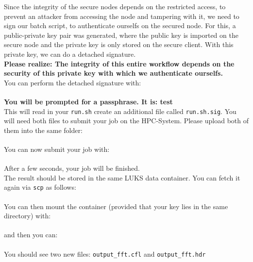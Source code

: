 \documentclass[paper=a4]{scrartcl}
\begin{document}
Since the integrity of the secure nodes depends on the restricted access, to prevent an attacker from accessing the node and tampering with it, we need to sign our batch script, to authenticate ourselfs on the secured node. 
For this, a public-private key pair was generated, where the public key is imported on the secure node and the private key is only stored on the secure client. With this private key, we can do a detached signature. 
\\
\textbf{Please realize: The integrity of this entire workflow depends on the security of this private key with which we authenticate ourselfs.}
\\
You can perform the detached signature with: \\
 \\
\textbf{You will be prompted for a passphrase. It is: test} \\
This will read in your \texttt{run.sh} create an additional file called \texttt{run.sh.sig}. 
You will need both files to submit your job on the HPC-System.
Please upload both of them into the same folder: \\
\\
You can now submit your job with: \\
\\
After a few seconds, your job will be finished.
\\
The result should be stored in the same LUKS data container. 
You can fetch it again via \texttt{scp} as follows: \\
\\
You can then mount the container (provided that your key lies in the same directory) with: \\
 \\
and then you can: \\
\\
You should see two new files: \texttt{output\_fft.cfl} and  \texttt{output\_fft.hdr}
\end{document}
